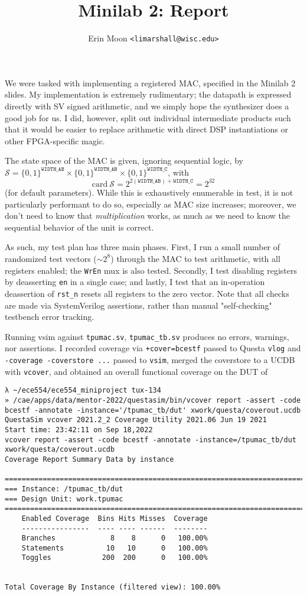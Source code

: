 \documentclass{article}
\title{Minilab 2: Report}
\author{Erin Moon \texttt{<limarshall@wisc.edu>}}
\begin{document}
\maketitle
We were tasked with implementing a registered MAC, specified in the Minilab 2 slides. My implementation is extremely rudimentary; the datapath is expressed directly with SV signed arithmetic, and we simply hope the synthesizer does a good job for us. I did, however, split out individual intermediate products such that it would be easier to replace arithmetic with direct DSP instantiations or other FPGA-specific magic.


The state space of the MAC is given, ignoring sequential logic, by \(\mathcal{S} = \{0,1\}^{\texttt{WIDTH\_AB}} \times \{0,1\}^{\texttt{WIDTH\_AB}} \times \{0,1\}^{\texttt{WIDTH\_C}}\), with \[\mathrm{card}\ \mathcal{S} = 2^{2(\texttt{WIDTH\_AB}) + \texttt{WIDTH\_C}} = 2^{32}\] (for default parameters). While this is exhaustively enumerable in test, it is not particularly performant to do so, especially as MAC size increases; moreover, we don't need to know that \emph{multiplication} works, as much as we need to know the sequential behavior of the unit is correct.

As such, my test plan has three main phases. First, I run a small number of randomized test vectors (\(\sim 2^8\)) through the MAC to test arithmetic, with all registers enabled; the \texttt{WrEn} mux is also tested. Secondly, I test disabling registers by deasserting \texttt{en} in a single case; and lastly, I test that an in-operation deassertion of \texttt{rst\_n} resets all registers to the zero vector. Note that all checks are made via SystemVerilog assertions, rather than manual "self-checking" testbench error tracking.

Running vsim against \texttt{tpumac.sv}, \texttt{tpumac\_tb.sv} produces no errors, warnings, nor assertions. I recorded coverage via \texttt{+cover=bcestf} passed to Questa \texttt{vlog} and \texttt{-coverage -coverstore ...} passed to \texttt{vsim}, merged the coverstore to a UCDB with \texttt{vcover}, and obtained an overall functional coverage on the DUT of
\begin{verbatim}
λ ~/ece554/ece554_miniproject tux-134
» /cae/apps/data/mentor-2022/questasim/bin/vcover report -assert -code bcestf -annotate -instance='/tpumac_tb/dut' xwork/questa/coverout.ucdb
QuestaSim vcover 2021.2_2 Coverage Utility 2021.06 Jun 19 2021
Start time: 23:42:11 on Sep 18,2022
vcover report -assert -code bcestf -annotate -instance=/tpumac_tb/dut xwork/questa/coverout.ucdb
Coverage Report Summary Data by instance

=================================================================================
=== Instance: /tpumac_tb/dut
=== Design Unit: work.tpumac
=================================================================================
    Enabled Coverage  Bins Hits Misses  Coverage
    ----------------  ---- ---- ------  --------
    Branches             8    8      0   100.00%
    Statements          10   10      0   100.00%
    Toggles            200  200      0   100.00%


Total Coverage By Instance (filtered view): 100.00%
\end{verbatim}
\end{document}
